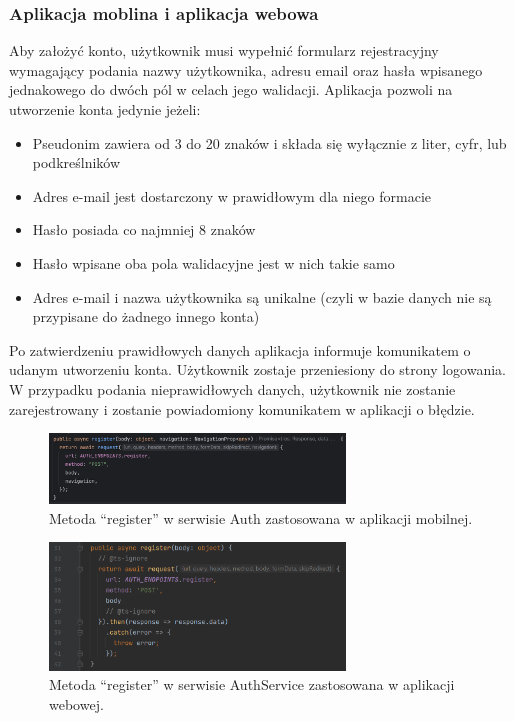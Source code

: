\subsubsection{Aplikacja moblina i aplikacja webowa}
Aby założyć konto, użytkownik musi wypełnić formularz rejestracyjny wymagający podania nazwy użytkownika, adresu email oraz hasła wpisanego jednakowego do dwóch pól w celach jego walidacji. Aplikacja pozwoli na utworzenie konta jedynie jeżeli:

\begin{itemize}
    \item Pseudonim zawiera od 3 do 20 znaków i składa się wyłącznie z liter, cyfr, lub podkreślników
    \item Adres e-mail jest dostarczony w prawidłowym dla niego formacie
    \item Hasło posiada co najmniej 8 znaków
    \item Hasło wpisane oba pola walidacyjne jest w nich takie samo
    \item Adres e-mail i nazwa użytkownika są unikalne (czyli w bazie danych nie są przypisane do żadnego innego konta)
\end{itemize}

Po zatwierdzeniu prawidłowych danych aplikacja informuje komunikatem o udanym utworzeniu konta. Użytkownik zostaje przeniesiony do strony logowania. W przypadku podania nieprawidłowych danych, użytkownik nie zostanie zarejestrowany i zostanie powiadomiony komunikatem w aplikacji o błędzie.

\begin{figure}[H]
    \centering
    \includegraphics[width=0.7\textwidth]{chapters/chapter_8/screens/rejestracja_mobile}
    \caption{Metoda “register” w serwisie Auth zastosowana w aplikacji mobilnej.}
    \label{img:rejestracja_mobile}
\end{figure}

\begin{figure}[H]
    \centering
    \includegraphics[width=0.7\textwidth]{chapters/chapter_8/screens/rejestracja_web}
    \caption{Metoda “register” w serwisie AuthService zastosowana w aplikacji webowej.}
    \label{img:rejestracja_web}
\end{figure}

